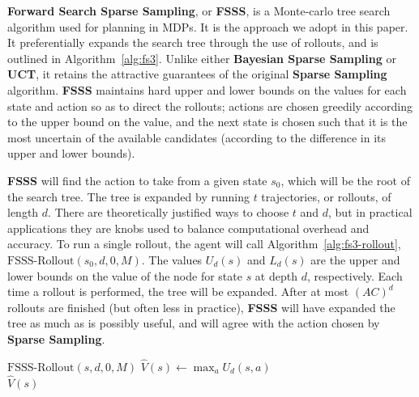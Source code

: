 {\bf Forward Search Sparse Sampling}, or {\bf FSSS}, is a Monte-carlo tree search algorithm used for planning in MDPs. It is the approach we adopt in this paper.  It preferentially expands the search tree through the use of rollouts, and is outlined in Algorithm~\ref{alg:fs3}. Unlike either {\bf Bayesian Sparse Sampling} or {\bf UCT}, it retains the attractive guarantees of the original {\bf Sparse Sampling} algorithm. {\bf FSSS} maintains hard upper and lower bounds on the values for each state and action so as to direct the rollouts; actions are chosen greedily according to the upper bound on the value, and the next state is chosen such that it is the most uncertain of the available candidates (according to the difference in its upper and lower bounds).

{\bf FSSS} will find the action to take from a given state $s_0$, which will be the root of the search tree.  The tree is expanded by running $t$ trajectories, or rollouts, of length $d$. There are theoretically justified ways to choose $t$ and $d$, but in practical applications they are knobs used to balance computational overhead and accuracy. To run a single rollout, the agent will call Algorithm~\ref{alg:fs3-rollout}, $\mbox{FSSS-Rollout}(s_0, d, 0, M)$.
The values $U_d(s)$ and $L_d(s)$ are the upper and lower bounds on the value of the node for state $s$ at depth $d$, respectively. Each time a rollout is performed, the tree will be expanded. After at most $(AC)^d$ rollouts are finished (but often less in practice), {\bf FSSS} will have expanded the tree as much as is possibly useful, and will agree with the action chosen by {\bf Sparse Sampling}.

\begin{algorithm}[tb]
	\caption{$\mbox{FSSS}(s, d, t, M)$}
	\label{alg:fs3}

	 {
		$\mbox{FSSS-Rollout}(s, d, 0, M)$
	}
	$\hat V(s) \leftarrow \max_a U_d(s, a)$\\
	\Return $\hat V(s)$
\end{algorithm}

